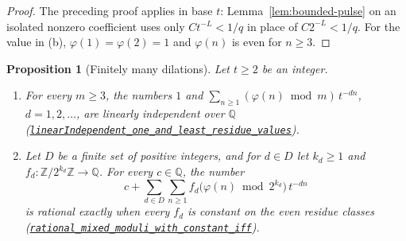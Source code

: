 \documentclass[11pt]{article}
\theoremstyle{plain}
\newtheorem{prop}[thm]{Proposition}
\theoremstyle{definition}
\theoremstyle{remark}
\newcommand{\Z}{\mathbb{Z}}
\newcommand{\Q}{\mathbb{Q}}
\begin{document}
\begin{proof}
The preceding proof applies in base $t$: Lemma~\ref{lem:bounded-pulse} on an
isolated nonzero coefficient uses only $Ct^{-L}<1/q$ in place of
$C2^{-L}<1/q$. For the value in (b), $\varphi(1)=\varphi(2)=1$ and
$\varphi(n)$ is even for $n\ge3$.
\end{proof}

\begin{prop}[Finitely many dilations]
\label{prop:dilations}
Let $t\ge2$ be an integer.
\begin{enumerate}[label=(\alph*),leftmargin=*]
\item For every $m\ge3$, the numbers $1$ and
  $\sum_{n\ge1}(\varphi(n)\bmod m)\,t^{-dn}$, $d=1,2,\ldots$, are linearly
  independent over $\Q$
  (\href{https://github.com/wcook04/plectis-erdos/blob/24edbddbe2bd68e920327a701aad0b9dd0d69675/lean/ErdosProblems/Erdos249/FiniteDilationLinearIndependent.lean\#L42}{\texttt{linearIndependent\_one\_and\_least\_residue\_values}}).
\item Let $D$ be a finite set of positive integers, and for $d\in D$ let
  $k_d\ge1$ and $f_d:\Z/2^{k_d}\Z\to\Q$. For every $c\in\Q$, the number
  \[
   c+\sum_{d\in D}\sum_{n\ge1}f_d\bigl(\varphi(n)\bmod2^{k_d}\bigr)\,t^{-dn}
  \]
  is rational exactly when every $f_d$ is constant on the even residue
  classes
  (\href{https://github.com/wcook04/plectis-erdos/blob/24edbddbe2bd68e920327a701aad0b9dd0d69675/lean/ErdosProblems/Erdos249/FiniteDilationMixedModuli.lean\#L95}{\texttt{rational\_mixed\_moduli\_with\_constant\_iff}}).
\end{enumerate}
\end{prop}
\end{document}
